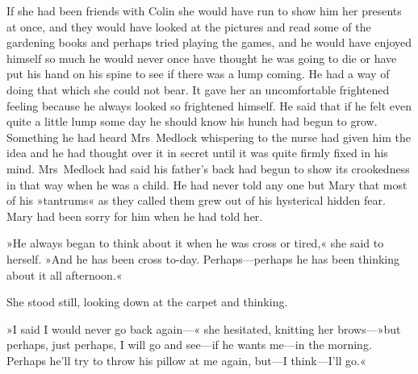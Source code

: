 If she had been friends with Colin she would have run to show him her presents at once, and they would have looked at the pictures and read some of the gardening books and perhaps tried playing the games, and he would have enjoyed himself so much he would never once have thought he was going to die or have put his hand on his spine to see if there was a lump coming. He had a way of doing that which she could not bear. It gave her an uncomfortable frightened feeling because he always looked so frightened himself. He said that if he felt even quite a little lump some day he should know his hunch had begun to grow. Something he had heard Mrs~Medlock whispering to the nurse had given him the idea and he had thought over it in secret until it was quite firmly fixed in his mind. Mrs~Medlock had said his father's back had begun to show its crookedness in that way when he was a child. He had never told any one but Mary that most of his »tantrums« as they called them grew out of his hysterical hidden fear. Mary had been sorry for him when he had told her.

»He always began to think about it when he was cross or tired,« she said to herself. »And he has been cross to-day. Perhaps—perhaps he has been thinking about it all afternoon.«

She stood still, looking down at the carpet and thinking.

»I said I would never go back again—« she hesitated, knitting her brows—»but perhaps, just perhaps, I will go and see—if he wants me—in the morning. Perhaps he'll try to throw his pillow at me again, but—I think—I'll go.«


